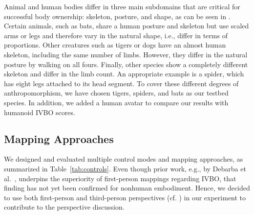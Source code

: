 \documentclass[conference]{IEEEtran}
\begin{document}
Animal and human bodies differ in three main subdomains that are critical for successful body ownership: skeleton, posture, and shape, as can be seen in . Certain animals, such as bats, share a human posture and skeleton but use scaled arms or legs and therefore vary in the natural shape, i.e., differ in terms of proportions. Other creatures such as tigers or dogs have an almost human skeleton, including the same number of limbs. However, they differ in the natural posture by walking on all fours. Finally, other species show a completely different skeleton and differ in the limb count. An appropriate example is a spider, which has eight legs attached to its head segment. To cover these different degrees of anthropomorphism, we have chosen tigers, spiders, and bats as our testbed species. In addition, we added a human avatar to compare our results with humanoid IVBO scores.



%



\subsection{Mapping Approaches}

We designed and evaluated multiple control modes and mapping approaches, as summarized in Table~\ref{tab:controls}. Even though prior work, e.g., by Debarba et al.~\cite{galvan2015characterizing}, underpins the superiority of first-person mappings regarding IVBO, that finding has not yet been confirmed for nonhuman embodiment. Hence, we decided to use both first-person and third-person perspectives (cf. ) in our experiment to contribute to the perspective discussion.
\end{document}
